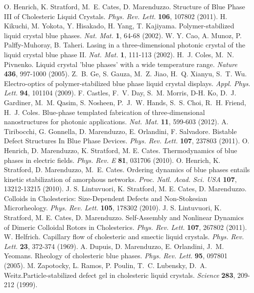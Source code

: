 \documentclass[12pt]{article}
\begin{document}
\begin{thebibliography}{99}
 O. Henrich, K. Stratford, M.~E. Cates, D. Marenduzzo.
 Structure of Blue Phase III of Cholesteric Liquid Crystals.
{\it Phys. Rev. Lett.} {\bf 106}, 107802 (2011).
 H. Kikuchi, M. Yokota, Y. Hisakado, H. Yang, T. Kajiyama.
Polymer-stabilized liquid crystal blue phases.
{\it Nat. Mat.} {\bf 1}, 64-68 (2002).
 W. Y. Cao, A. Munoz, P. Palffy-Muhoray, B. Taheri.
Lasing in a three-dimensional photonic crystal of the liquid crystal blue 
phase II. {\it Nat. Mat.} {\bf 1}, 111-113 (2002).
 H.~J. Coles, M.~N. Pivnenko.
Liquid crystal 'blue phases' with a wide temperature range.
{\it Nature} {\bf 436}, 997-1000 (2005).
 Z.~B. Ge, S. Gauza, M.~Z. Jiao, H.~Q. Xianyu, S.~T. Wu.
 Electro-optics of polymer-stabilized blue phase liquid crystal displays.
{\it Appl. Phys. Lett.} {\bf 94}, 101104 (2009).
 F. Castles, F.~V. Day, S.~M. Morris, D-H. Ko, D.~J. Gardiner, M.~M. Qasim, S. Nosheen, P.~J.~W. Hands, S.~S. Choi, R.~H. Friend, H.~J. Coles.
Blue-phase templated fabrication of three-dimensional nanostructures for photonic applications. {\it Nat. Mat.} {\bf 11}, 599-603 (2012).
 A. Tiribocchi, G. Gonnella, D. Marenduzzo, E. Orlandini,
F. Salvadore. Bistable Defect Structures In Blue Phase Devices. 
 {\it Phys. Rev. Lett.} {\bf 107}, 237803 (2011).
  O. Henrich, D. Marenduzzo, K. Stratford, 
M. E. Cates. Thermodynamics of blue phases in electric fields.
{\it Phys. Rev. E} {\bf 81}, 031706 (2010).
 O. Henrich, K. Stratford, D. Marenduzzo, M.~E. Cates.
 Ordering dynamics of blue phases entails kinetic stabilization of amorphous networks. {\it Proc. Natl. Acad. Sci. USA} {\bf 107}, 13212-13215 (2010).
 J. S. Lintuvuori, K. Stratford, M. E. Cates,
D. Marenduzzo.   Colloids in Cholesterics: Size-Dependent Defects and Non-Stokesian Microrheology. {\it Phys. Rev. Lett.} {\bf 105}, 178302 (2010).
  J. S. Lintuvuori, K. Stratford, M. E. Cates,
D. Marenduzzo. 
Self-Assembly and Nonlinear Dynamics of Dimeric Colloidal Rotors in 
Cholesterics. {\it Phys. Rev. Lett.} {\bf 107}, 267802 (2011).
 	W. Helfrich. Capillary flow of cholesteric
and smectic liquid crystals. {\it Phys. Rev. Lett.} {\bf 23}, 372-374 (1969).
 A. Dupuis, D. Marenduzzo, E. Orlandini, J.~M. Yeomans.
Rheology of cholesteric blue phases. {\it Phys. Rev. Lett.} {\bf 95},
097801 (2005).
 M. Zapotocky, L. Ramos, P. Poulin, T.~C. Lubensky, 
D.~A. Weitz.Particle-stabilized defect gel in cholesteric liquid crystals.  {\it Science} {\bf 283}, 209-212 (1999).

\end{thebibliography}
\end{document}
